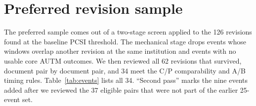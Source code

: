\section{Preferred revision sample}\label{app:events}

The preferred sample comes out of a two-stage screen applied to the 126 revisions found at the baseline PCSI threshold.
The mechanical stage drops events whose windows overlap another revision at the same institution and events with no usable
core AUTM outcomes. We then reviewed all 62 revisions that survived, document pair by document pair, and 34 meet the C/P
comparability and A/B timing rules. Table~\ref{tab:events} lists all 34. ``Second pass'' marks the nine events added after
we reviewed the 37 eligible pairs that were not part of the earlier 25-event set.


